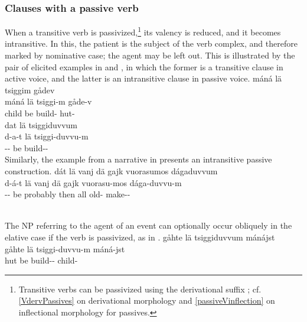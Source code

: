\subsubsection{Clauses with a passive verb}\label{passiveVoice}
When a transitive verb is passivized,\footnote{Transitive verbs can be passivized using the derivational suffix ; cf. \SEC\ref{VdervPassives} on derivational morphology and \SEC\ref{passiveVinflection} on inflectional morphology for passives.} 
its valency is reduced, and it becomes intransitive. In this, the patient is the subject of the verb complex, and therefore marked by nominative case; the agent may be left out. This is illustrated by the pair of elicited examples in  and , in which the former is a transitive clause in active voice, and the latter is an intransitive clause in passive voice. %
\ea\label{passVoiceEx1}%
\glll	máná lä tsiggim gådev\\
	máná lä tsiggi-m gåde-v\\
	child\BS{} be\BS{} build- hut-\\\nopagebreak
{}	
\z
\ea\label{passVoiceEx2}%
\glll	dat lä tsiggiduvvum\\
	d-a-t lä tsiggi-duvvu-m\\
	-- be\BS{} build--\\\nopagebreak
{}	
\z
Similarly, the example from a narrative in  presents an intransitive passive construction.
\ea\label{passVoiceEx2b}%
\glll	dát lä vanj dä gajk vuorasumos dágaduvvum\\
	d-á-t lä vanj dä gajk vuorasu-mos dága-duvvu-m\\
	-- be\BS{} probably then all old-\BS{} make--\\\nopagebreak
{}\\	
\z

The NP referring to the agent of an event can optionally occur obliquely in the elative case if the verb is passivized, as in . \ea\label{passVoiceEx3}%
\glll	gåhte lä tsiggiduvvum mánájst\\
	gåhte lä tsiggi-duvvu-m máná-jst\\
	hut\BS{} be\BS{} build-- child-\\\nopagebreak
{}	
\z


